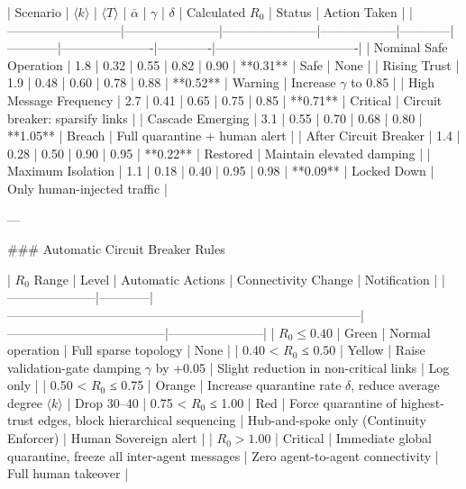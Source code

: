 | Scenario                  | \(\langle k \rangle\) | \(\langle T \rangle\) | \(\bar{\alpha}\) | \(\gamma\) | \(\delta\) | Calculated \( R_0 \) | Status      | Action Taken                     |
|---------------------------|-----------------------|-----------------------|------------------|------------|------------|----------------------|-------------|----------------------------------|
| Nominal Safe Operation    | 1.8                   | 0.32                  | 0.55             | 0.82       | 0.90       | **0.31**             | Safe        | None                             |
| Rising Trust              | 1.9                   | 0.48                  | 0.60             | 0.78       | 0.88       | **0.52**             | Warning     | Increase \(\gamma\) to 0.85      |
| High Message Frequency    | 2.7                   | 0.41                  | 0.65             | 0.75       | 0.85       | **0.71**             | Critical    | Circuit breaker: sparsify links  |
| Cascade Emerging          | 3.1                   | 0.55                  | 0.70             | 0.68       | 0.80       | **1.05**             | Breach      | Full quarantine + human alert    |
| After Circuit Breaker     | 1.4                   | 0.28                  | 0.50             | 0.90       | 0.95       | **0.22**             | Restored    | Maintain elevated damping        |
| Maximum Isolation         | 1.1                   | 0.18                  | 0.40             | 0.95       | 0.98       | **0.09**             | Locked Down | Only human-injected traffic      |

---

### Automatic Circuit Breaker Rules

| \( R_0 \) Range     | Level      | Automatic Actions                                                                 | Connectivity Change                  | Notification          |
|---------------------|------------|------------------------------------------------------------------------------------|--------------------------------------|-----------------------|
| \( R_0 \le 0.40 \)  | Green      | Normal operation                                                                   | Full sparse topology                 | None                  |
| 0.40 < \( R_0 \) ≤ 0.50 | Yellow | Raise validation-gate damping \(\gamma\) by +0.05                                 | Slight reduction in non-critical links | Log only             |
| 0.50 < \( R_0 \) ≤ 0.75 | Orange | Increase quarantine rate \(\delta\), reduce average degree \(\langle k \rangle\)  | Drop 30–40%
| 0.75 < \( R_0 \) ≤ 1.00 | Red    | Force quarantine of highest-trust edges, block hierarchical sequencing            | Hub-and-spoke only (Continuity Enforcer) | Human Sovereign alert |
| \( R_0 > 1.00 \)    | Critical   | Immediate global quarantine, freeze all inter-agent messages                      | Zero agent-to-agent connectivity     | Full human takeover  |

